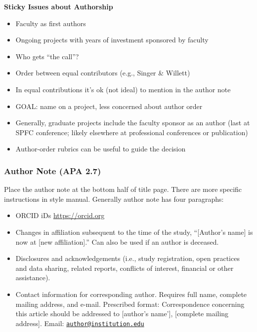 \documentclass[
  11pt,
]{book}
\providecommand{\tightlist}{%
  \setlength{\itemsep}{0pt}\setlength{\parskip}{0pt}}
\begin{document}
\textbf{Sticky Issues about Authorship}

\begin{itemize}
\tightlist
\item
  Faculty as first authors
\item
  Ongoing projects with years of investment sponsored by faculty
\item
  Who gets ``the call''?
\item
  Order between equal contributors (e.g., Singer \& Willett)
\item
  In equal contributions it's ok (not ideal) to mention in the author note
\item
  GOAL: name on a project, less concerned about author order
\item
  Generally, graduate projects include the faculty sponsor as an author (last at SPFC conference; likely elsewhere at professional conferences or publication)
\item
  Author-order rubrics can be useful to guide the decision
\end{itemize}

\hypertarget{author-note-apa-2.7}{%
\subsubsection{Author Note (APA 2.7)}\label{author-note-apa-2.7}}

Place the author note at the bottom half of title page. There are more specific instructions in style manual. Generally author note has four paragraphs:

\begin{itemize}
\tightlist
\item
  ORCID iDs \url{https://orcid.org}
\item
  Changes in affiliation subsequent to the time of the study, ``{[}Author's name{]} is now at {[}new affiliation{]}.'' Can also be used if an author is deceased.
\item
  Disclosures and acknowledgements (i.e., study registration, open practices and data sharing, related reports, conflicts of interest, financial or other assistance).
\item
  Contact information for corresponding author. Requires full name, complete mailing address, and e-mail. Prescribed format: Correspondence concerning this article should be addressed to {[}author's name'{]}, {[}complete mailing address{]}. Email: \href{mailto:author@institution.edu}{\nolinkurl{author@institution.edu}}
\end{itemize}
\end{document}
